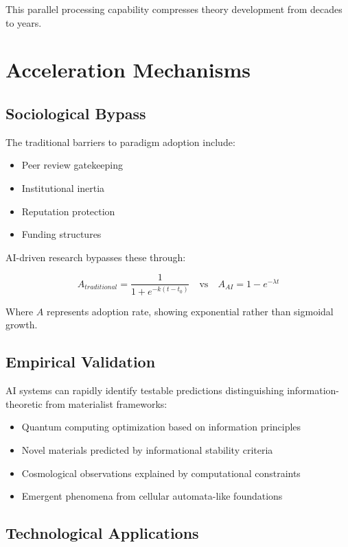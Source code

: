 \documentclass[12pt,preprint]{article}
\begin{document}
This parallel processing capability compresses theory development from decades to years.

\section{Acceleration Mechanisms}

\subsection{Sociological Bypass}

The traditional barriers to paradigm adoption include:

\begin{itemize}
\item Peer review gatekeeping
\item Institutional inertia
\item Reputation protection
\item Funding structures
\end{itemize}

AI-driven research bypasses these through:

\begin{equation}
A_{traditional} = \frac{1}{1 + e^{-k(t-t_0)}} \quad \text{vs} \quad A_{AI} = 1 - e^{-\lambda t}
\end{equation}

Where $A$ represents adoption rate, showing exponential rather than sigmoidal growth.

\subsection{Empirical Validation}

AI systems can rapidly identify testable predictions distinguishing information-theoretic from materialist frameworks:

\begin{itemize}
\item Quantum computing optimization based on information principles
\item Novel materials predicted by informational stability criteria
\item Cosmological observations explained by computational constraints
\item Emergent phenomena from cellular automata-like foundations
\end{itemize}

\subsection{Technological Applications}
\end{document}
